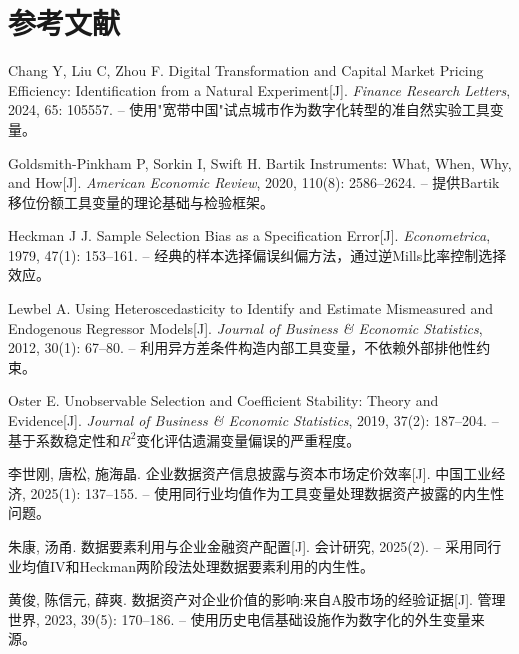\documentclass[11pt,a4paper]{article}
\begin{document}
\section*{参考文献}

\begin{enumerate}[label={[\arabic*]}, leftmargin=2em, itemsep=3pt]

\item Chang Y, Liu C, Zhou F. Digital Transformation and Capital Market Pricing Efficiency: Identification from a Natural Experiment[J]. \textit{Finance Research Letters}, 2024, 65: 105557.
\--- 使用"宽带中国"试点城市作为数字化转型的准自然实验工具变量。

\item Goldsmith-Pinkham P, Sorkin I, Swift H. Bartik Instruments: What, When, Why, and How[J]. \textit{American Economic Review}, 2020, 110(8): 2586--2624.
\--- 提供Bartik移位份额工具变量的理论基础与检验框架。

\item Heckman J J. Sample Selection Bias as a Specification Error[J]. \textit{Econometrica}, 1979, 47(1): 153--161.
\--- 经典的样本选择偏误纠偏方法，通过逆Mills比率控制选择效应。

\item Lewbel A. Using Heteroscedasticity to Identify and Estimate Mismeasured and Endogenous Regressor Models[J]. \textit{Journal of Business \& Economic Statistics}, 2012, 30(1): 67--80.
\--- 利用异方差条件构造内部工具变量，不依赖外部排他性约束。

\item Oster E. Unobservable Selection and Coefficient Stability: Theory and Evidence[J]. \textit{Journal of Business \& Economic Statistics}, 2019, 37(2): 187--204.
\--- 基于系数稳定性和$R^2$变化评估遗漏变量偏误的严重程度。

\item 李世刚, 唐松, 施海晶. 企业数据资产信息披露与资本市场定价效率[J]. 中国工业经济, 2025(1): 137--155.
\--- 使用同行业均值作为工具变量处理数据资产披露的内生性问题。

\item 朱康, 汤甬. 数据要素利用与企业金融资产配置[J]. 会计研究, 2025(2).
\--- 采用同行业均值IV和Heckman两阶段法处理数据要素利用的内生性。

\item 黄俊, 陈信元, 薛爽. 数据资产对企业价值的影响:来自A股市场的经验证据[J]. 管理世界, 2023, 39(5): 170--186.
\--- 使用历史电信基础设施作为数字化的外生变量来源。

\end{enumerate}
\end{document}
